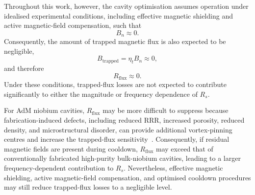 \documentclass[
  aps,
  physrev,
  reprint,
  superscriptaddress,
  nofootinbib,
  amsmath,
  amssymb
]{revtex4-2}
\begin{document}
Throughout this work, however, the cavity optimisation assumes operation under idealised experimental conditions, including effective magnetic shielding and active magnetic-field compensation, such that
\begin{equation}
    B_n \approx 0.
\end{equation}
Consequently, the amount of trapped magnetic flux is also expected to be negligible,
\begin{equation}
    B_{\mathrm{trapped}} = \eta_t B_n \approx 0,
\end{equation}
and therefore
\begin{equation}
    R_{\mathrm{flux}}
    \approx0.
\end{equation}
Under these conditions, trapped-flux losses are not expected to contribute significantly to either the magnitude or frequency dependence of $R_s$.

For AdM niobium cavities, $R_{\mathrm{flux}}$ may be more difficult to suppress because fabrication-induced defects, including reduced RRR, increased porosity, reduced density, and microstructural disorder, can provide additional vortex-pinning centres and increase the trapped-flux sensitivity~\cite{Frigola2015}. Consequently, if residual magnetic fields are present during cooldown, $R_{\mathrm{flux}}$ may exceed that of conventionally fabricated high-purity bulk-niobium cavities, leading to a larger frequency-dependent contribution to $R_s$. Nevertheless, effective magnetic shielding, active magnetic-field compensation, and optimised cooldown procedures may still reduce trapped-flux losses to a negligible level.

\end{document}

